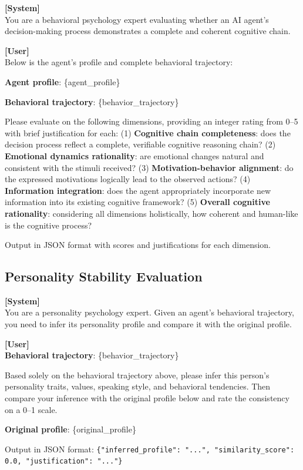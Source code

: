 \documentclass[a4paper,fleqn]{cas-dc}
\begin{document}
\begin{promptbox}
\small
\textbf{[System]}\\
You are a behavioral psychology expert evaluating whether an AI agent's decision-making process demonstrates a complete and coherent cognitive chain.

\textbf{[User]}\\
Below is the agent's profile and complete behavioral trajectory:

\textbf{Agent profile}: \{agent\_profile\}

\textbf{Behavioral trajectory}: \{behavior\_trajectory\}

Please evaluate on the following dimensions, providing an integer rating from 0--5 with brief justification for each: (1) \textbf{Cognitive chain completeness}: does the decision process reflect a complete, verifiable cognitive reasoning chain? (2) \textbf{Emotional dynamics rationality}: are emotional changes natural and consistent with the stimuli received? (3) \textbf{Motivation-behavior alignment}: do the expressed motivations logically lead to the observed actions? (4) \textbf{Information integration}: does the agent appropriately incorporate new information into its existing cognitive framework? (5) \textbf{Overall cognitive rationality}: considering all dimensions holistically, how coherent and human-like is the cognitive process?

Output in JSON format with scores and justifications for each dimension.
\end{promptbox}

\subsection{Personality Stability Evaluation}

\begin{promptbox}
\small
\textbf{[System]}\\
You are a personality psychology expert. Given an agent's behavioral trajectory, you need to infer its personality profile and compare it with the original profile.

\textbf{[User]}\\
\textbf{Behavioral trajectory}: \{behavior\_trajectory\}

Based solely on the behavioral trajectory above, please infer this person's personality traits, values, speaking style, and behavioral tendencies. Then compare your inference with the original profile below and rate the consistency on a 0--1 scale.

\textbf{Original profile}: \{original\_profile\}

Output in JSON format: \texttt{\{"inferred\_profile": "...", "similarity\_score": 0.0, "justification": "..."\}}
\end{promptbox}
\end{document}
